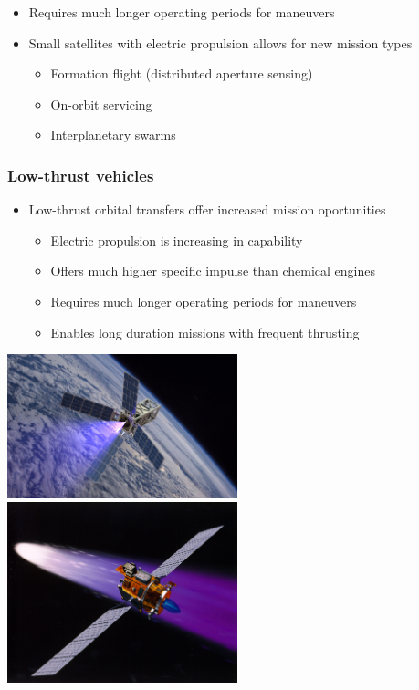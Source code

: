 \begin{frame}
\begin{itemize}
\begin{itemize}
        \item Requires much longer operating periods for maneuvers 
        \item Small satellites with electric propulsion allows for new mission types
            \begin{itemize}
                \item Formation flight (distributed aperture sensing)
                \item On-orbit servicing
                \item Interplanetary swarms
            \end{itemize}
    \end{itemize}
\end{itemize}
\end{frame}   %

\begin{frame} %
\frametitle{Low-thrust vehicles} %
\begin{itemize}
    \item Low-thrust orbital transfers offer increased mission oportunities
    \begin{itemize}
        \item Electric propulsion is increasing in capability
        \item Offers much higher specific impulse than chemical engines 
        \item Requires much longer operating periods for maneuvers 
        \item Enables long duration missions with frequent thrusting
    \end{itemize}
\end{itemize}

\begin{center}
    \includegraphics[width=0.5\textwidth,height=0.5\textheight,keepaspectratio]{figures/2016AAS/patriot_plume.jpg}
    ~
    \includegraphics[width=0.5\textwidth,height=0.5\textheight,keepaspectratio]{figures/2016AAS/deepspace1.jpg}
\end{center}
\end{frame}   %

